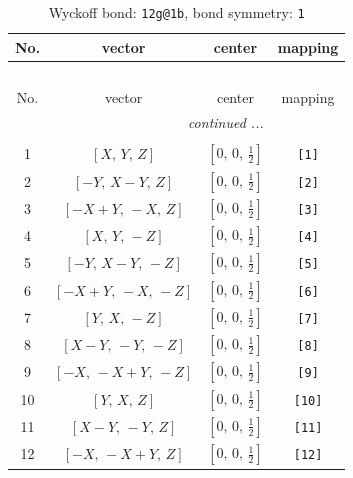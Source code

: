 \documentclass[fleqn,8pt]{jsarticle}
\begin{document}
\begin{longtable}{cccc}
\caption{Wyckoff bond: {\tt 12g@1b}, bond symmetry: {\tt 1}}
 \\
 \hline \hline
No. & vector & center & mapping \\ \hline \endfirsthead

\multicolumn{3}{l}{\tablename\ \thetable{}} \\
 \hline \hline
No. & vector & center & mapping \\ \hline \endhead

 \hline \hline
\multicolumn{3}{r}{\footnotesize\it continued ...} \\ \endfoot

 \hline \hline
\multicolumn{3}{r}{} \\ \endlastfoot

1 & $\left[ X,\, Y,\, Z \right]$ & $\left[ 0,\, 0,\, \frac{1}{2} \right]$ & {\tt [1]} \\ \hline
2 & $\left[ - Y,\, X - Y,\, Z \right]$ & $\left[ 0,\, 0,\, \frac{1}{2} \right]$ & {\tt [2]} \\ \hline
3 & $\left[ - X + Y,\, - X,\, Z \right]$ & $\left[ 0,\, 0,\, \frac{1}{2} \right]$ & {\tt [3]} \\ \hline
4 & $\left[ X,\, Y,\, - Z \right]$ & $\left[ 0,\, 0,\, \frac{1}{2} \right]$ & {\tt [4]} \\ \hline
5 & $\left[ - Y,\, X - Y,\, - Z \right]$ & $\left[ 0,\, 0,\, \frac{1}{2} \right]$ & {\tt [5]} \\ \hline
6 & $\left[ - X + Y,\, - X,\, - Z \right]$ & $\left[ 0,\, 0,\, \frac{1}{2} \right]$ & {\tt [6]} \\ \hline
7 & $\left[ Y,\, X,\, - Z \right]$ & $\left[ 0,\, 0,\, \frac{1}{2} \right]$ & {\tt [7]} \\ \hline
8 & $\left[ X - Y,\, - Y,\, - Z \right]$ & $\left[ 0,\, 0,\, \frac{1}{2} \right]$ & {\tt [8]} \\ \hline
9 & $\left[ - X,\, - X + Y,\, - Z \right]$ & $\left[ 0,\, 0,\, \frac{1}{2} \right]$ & {\tt [9]} \\ \hline
10 & $\left[ Y,\, X,\, Z \right]$ & $\left[ 0,\, 0,\, \frac{1}{2} \right]$ & {\tt [10]} \\ \hline
11 & $\left[ X - Y,\, - Y,\, Z \right]$ & $\left[ 0,\, 0,\, \frac{1}{2} \right]$ & {\tt [11]} \\ \hline
12 & $\left[ - X,\, - X + Y,\, Z \right]$ & $\left[ 0,\, 0,\, \frac{1}{2} \right]$ & {\tt [12]} \\
\end{longtable}
\end{document}
